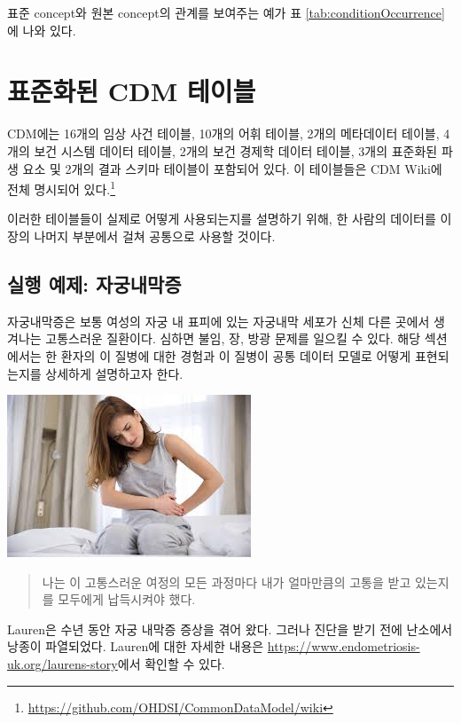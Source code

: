 \documentclass[11pt]{book}
\let\rmarkdownfootnote\footnote%
\def\footnote{\protect\rmarkdownfootnote}
\theoremstyle{definition}
\theoremstyle{definition}
\theoremstyle{definition}
\theoremstyle{remark}
\begin{document}
표준 concept와 원본 concept의 관계를 보여주는 예가 표
\ref{tab:conditionOccurrence}에 나와 있다.

\section{표준화된 CDM 테이블}\label{-cdm-}


CDM에는 16개의 임상 사건 테이블, 10개의 어휘 테이블, 2개의 메타데이터
테이블, 4개의 보건 시스템 데이터 테이블, 2개의 보건 경제학 데이터
테이블, 3개의 표준화된 파생 요소 및 2개의 결과 스키마 테이블이 포함되어
있다. 이 테이블들은 CDM Wiki에 전체 명시되어 있다.\footnote{\url{https://github.com/OHDSI/CommonDataModel/wiki}}

이러한 테이블들이 실제로 어떻게 사용되는지를 설명하기 위해, 한 사람의
데이터를 이 장의 나머지 부분에서 걸쳐 공통으로 사용할 것이다.

\subsection{실행 예제: 자궁내막증}\label{--}

자궁내막증은 보통 여성의 자궁 내 표피에 있는 자궁내막 세포가 신체 다른
곳에서 생겨나는 고통스러운 질환이다. 심하면 불임, 장, 방광 문제를 일으킬
수 있다. 해당 섹션에서는 한 환자의 이 질병에 대한 경험과 이 질병이 공통
데이터 모델로 어떻게 표현되는지를 상세하게 설명하고자 한다.

\begin{center}\includegraphics[width=0.5\linewidth]{images/CommonDataModel/Lauren} \end{center}

\begin{quote}
나는 이 고통스러운 여정의 모든 과정마다 내가 얼마만큼의 고통을 받고
있는지를 모두에게 납득시켜야 했다.
\end{quote}

Lauren은 수년 동안 자궁 내막증 증상을 겪어 왔다. 그러나 진단을 받기 전에
난소에서 낭종이 파열되었다. Lauren에 대한 자세한 내용은
\url{https://www.endometriosis-uk.org/laurens-story}에서 확인할 수 있다.
\end{document}

